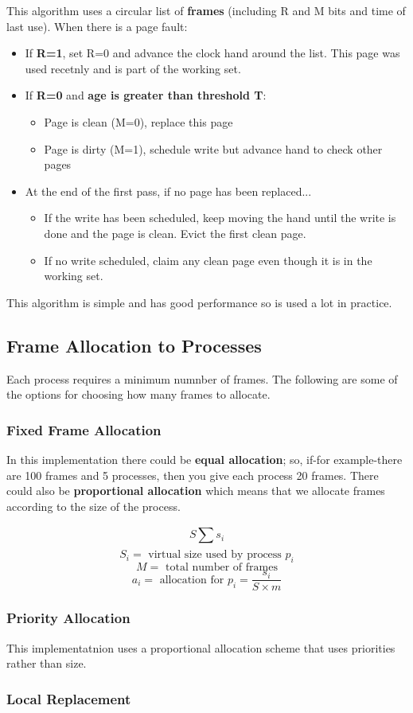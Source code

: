 \documentclass{article}
\newcommand{\bold}[1]{\textbf{#1}}
\renewcommand{\b}{\item[$\circ$]}
\newcommand{\newlist}{\begin{itemize}}
\renewcommand{\endlist}{\end{itemize}}
\begin{document}
This algorithm uses a circular list of \bold{frames} (including R and M bits and time of last use). When there is a page fault: 

\newlist
\b If \bold{R=1}, set R=0 and advance the clock hand around the list. This page was used recetnly and is part of the working set. 
\b If \bold{R=0} and \bold{age is greater than threshold T}:
\newlist 
\b Page is clean (M=0), replace this page
\b Page is dirty (M=1), schedule write but advance hand to check other pages
\endlist
\b At the end of the first pass, if no page has been replaced...
\newlist
\b If the write has been scheduled, keep moving the hand until the write is done and the page is clean. Evict the first clean page. 
\b If no write scheduled, claim any clean page even though it is in the working set. 
\endlist
\endlist

This algorithm is simple and has good performance so is used a lot in practice. 

\subsection{Frame Allocation to Processes}

Each process requires a minimum numnber of frames. The following are some of the options for choosing how many frames to allocate.

\subsubsection{Fixed Frame Allocation}

In this implementation there could be \bold{equal allocation}; so, if-for example-there are 100 frames and 5 processes, then you give each process 20 frames. There could also be \bold{proportional allocation} which means that we allocate frames according to the size of the process. 

$$S \sum_{}^{} s_i$$
$$S_i = \textrm{ virtual size used by process } p_i$$
$$M = \textrm{ total number of frames}$$ 
$$a_i = \textrm{ allocation for } p_i = \frac{s_i}{S \times m}$$

\subsubsection{Priority Allocation}

This implementatnion uses a proportional allocation scheme that uses priorities rather than size. 

\subsubsection{Local Replacement}
\end{document}
